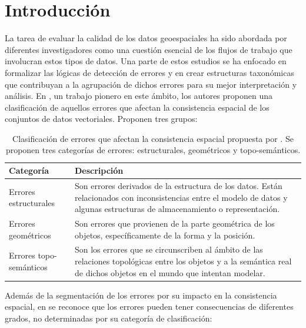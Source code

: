 \chapter{Introducción}
\label{ch:introduccion}

La tarea de evaluar la calidad de los datos geoespaciales ha sido abordada por diferentes investigadores como una cuestión esencial de los flujos de trabajo que involucran estos tipos de datos. Una parte de estos estudios se ha enfocado en formalizar las lógicas de detección de errores y en crear estructuras taxonómicas que contribuyan a la agrupación de dichos errores para su mejor interpretación y análisis. En \cite{servigne_methodology_2000}, un trabajo pionero en este ámbito, los autores proponen una clasificación de aquellos errores que afectan la consistencia espacial de los conjuntos de datos vectoriales. Proponen tres grupos:

\begin{table}[H]
	\centering
	\caption{Clasificación de errores que afectan la consistencia espacial propuesta por \cite{servigne_methodology_2000}. Se proponen tres categorías de errores: estructurales, geométricos y topo-semánticos.}
	\label{tab:servigne_errores}
	\begin{tabularx}{\textwidth}{@{}l X@{}}
		\toprule
		\textbf{Categoría}      & \textbf{Descripción}                                                                                                                                                           \\
		\midrule
		Errores estructurales   & Son errores derivados de la estructura de los datos. Están relacionados con inconsistencias entre el modelo de datos y algunas estructuras de almacenamiento o representación. \\
		Errores geométricos     & Son errores que provienen de la parte geométrica de los objetos, específicamente de la forma y la posición.                                                                    \\
		Errores topo-semánticos & Son los errores que se circunscriben al ámbito de las relaciones topológicas entre los objetos y a la semántica real de dichos objetos en el mundo que intentan modelar.       \\
		\bottomrule
	\end{tabularx}
\end{table}

Además de la segmentación de los errores por su impacto en la consistencia espacial, en \cite{servigne_methodology_2000} se reconoce que los errores pueden tener consecuencias de diferentes grados, no determinadas por su categoría de clasificación:

